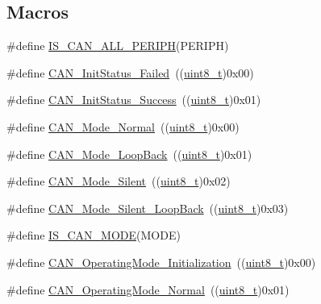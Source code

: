 \subsection*{Macros}
\begin{DoxyCompactItemize}
\item 
\#define \hyperlink{group___c_a_n___exported___types_gaf471a53f52a02078ffd842658d932f63}{I\+S\+\_\+\+C\+A\+N\+\_\+\+A\+L\+L\+\_\+\+P\+E\+R\+I\+PH}(P\+E\+R\+I\+PH)
\item 
\#define \hyperlink{group___c_a_n__sleep__constants_ga095c319e8c54c974eb2b6eeadf180d96}{C\+A\+N\+\_\+\+Init\+Status\+\_\+\+Failed}~((\hyperlink{_p_e___types_8h_aba7bc1797add20fe3efdf37ced1182c5}{uint8\+\_\+t})0x00)
\item 
\#define \hyperlink{group___c_a_n__sleep__constants_ga6bed5957af8f2f6b00568e15ccac5772}{C\+A\+N\+\_\+\+Init\+Status\+\_\+\+Success}~((\hyperlink{_p_e___types_8h_aba7bc1797add20fe3efdf37ced1182c5}{uint8\+\_\+t})0x01)
\item 
\#define \hyperlink{group___c_a_n___mode_gaaf1f48ab4917ccfd5fd31dd781d59e29}{C\+A\+N\+\_\+\+Mode\+\_\+\+Normal}~((\hyperlink{_p_e___types_8h_aba7bc1797add20fe3efdf37ced1182c5}{uint8\+\_\+t})0x00)
\item 
\#define \hyperlink{group___c_a_n___mode_gaad036c944403186eb3496ff65020c0ee}{C\+A\+N\+\_\+\+Mode\+\_\+\+Loop\+Back}~((\hyperlink{_p_e___types_8h_aba7bc1797add20fe3efdf37ced1182c5}{uint8\+\_\+t})0x01)
\item 
\#define \hyperlink{group___c_a_n___mode_gac05e5d666f18eb35e8da70e6e17e8fb8}{C\+A\+N\+\_\+\+Mode\+\_\+\+Silent}~((\hyperlink{_p_e___types_8h_aba7bc1797add20fe3efdf37ced1182c5}{uint8\+\_\+t})0x02)
\item 
\#define \hyperlink{group___c_a_n___mode_ga087afa0d24d2cf399225993573c984eb}{C\+A\+N\+\_\+\+Mode\+\_\+\+Silent\+\_\+\+Loop\+Back}~((\hyperlink{_p_e___types_8h_aba7bc1797add20fe3efdf37ced1182c5}{uint8\+\_\+t})0x03)
\item 
\#define \hyperlink{group___c_a_n___mode_ga5d6480c240edeba383b4e07d65814d98}{I\+S\+\_\+\+C\+A\+N\+\_\+\+M\+O\+DE}(M\+O\+DE)
\item 
\#define \hyperlink{group___c_a_n___operating___mode_gace8a4b5c164aba6f473d6254ad1e8a36}{C\+A\+N\+\_\+\+Operating\+Mode\+\_\+\+Initialization}~((\hyperlink{_p_e___types_8h_aba7bc1797add20fe3efdf37ced1182c5}{uint8\+\_\+t})0x00)
\item 
\#define \hyperlink{group___c_a_n___operating___mode_ga663ecffaa60d1a201a035dfa45325848}{C\+A\+N\+\_\+\+Operating\+Mode\+\_\+\+Normal}~((\hyperlink{_p_e___types_8h_aba7bc1797add20fe3efdf37ced1182c5}{uint8\+\_\+t})0x01)

\end{DoxyCompactItemize}
